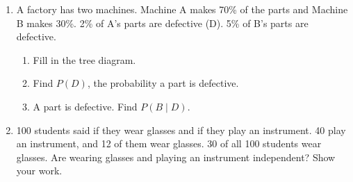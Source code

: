 \documentclass[11pt]{article}
\begin{document}
\begin{enumerate}
\newpage
\item A factory has two machines. Machine A makes 70\% of the parts and Machine B makes 30\%.
2\% of A's parts are defective (D). 5\% of B's parts are defective.
\begin{enumerate}[itemsep=1em]
  \item Fill in the tree diagram.

  \begin{center}\end{center}
  \item Find $P(D)$, the probability a part is defective. 
  \work{1.5em}
  \item A part is defective. Find $P(B \mid D)$.

\end{enumerate}
\work{2em}

\item 100 students said if they wear glasses and if they play an instrument.
40 play an instrument, and 12 of them wear glasses. 30 of all 100 students wear glasses.
Are wearing glasses and playing an instrument independent? Show your work.


\end{enumerate}
\end{document}
